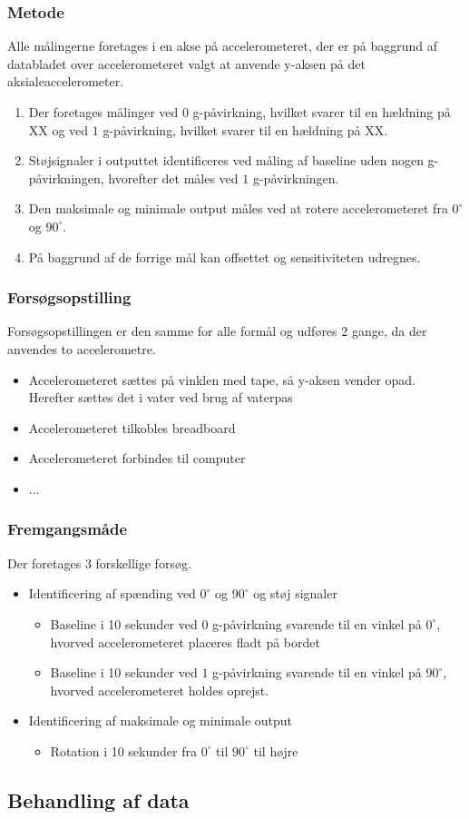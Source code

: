 \subsubsection{Metode}
Alle målingerne foretages i en akse på accelerometeret, der er på baggrund af databladet over accelerometeret valgt at anvende y-aksen på det aksialeaccelerometer. 
\begin{enumerate}
\item Der foretages målinger ved $0$ g-påvirkning, hvilket svarer til en hældning på XX og ved $1$ g-påvirkning, hvilket svarer til en hældning på XX. 
\item Støjsignaler i outputtet identificeres ved måling af baseline uden nogen g-påvirkningen, hvorefter det måles ved $1$ g-påvirkningen. 
\item Den maksimale og minimale output måles ved at rotere accelerometeret fra $0^{\circ}$ og $90^{\circ}$.
\item På baggrund af de forrige mål kan offsettet og sensitiviteten udregnes.
\end{enumerate}

\subsubsection{Forsøgsopstilling}
Forsøgsopstillingen er den samme for alle formål og udføres 2 gange, da der anvendes to accelerometre.
\begin{itemize}
\item Accelerometeret sættes på vinklen med tape, så y-aksen vender opad. Herefter sættes det i vater ved brug af vaterpas
\item Accelerometeret tilkobles breadboard
\item Accelerometeret forbindes til computer
\item ...
\end{itemize}

\subsubsection{Fremgangsmåde}
Der foretages  3 forskellige forsøg.
\begin{itemize}
\item Identificering af spænding ved $0^{\circ}$ og $90^{\circ}$ og støj signaler
\begin{itemize}
\item Baseline i 10 sekunder ved $0$ g-påvirkning svarende til en vinkel på $0^{\circ}$, hvorved accelerometeret placeres fladt på bordet
\item Baseline i 10 sekunder ved $1$ g-påvirkning svarende til en vinkel på $90^{\circ}$, hvorved accelerometeret holdes oprejst.
\end{itemize}
\item Identificering af maksimale og minimale output 
\begin{itemize}
\item Rotation i 10 sekunder fra $0^{\circ}$ til $90^{\circ}$ til højre
\end{itemize}
\end{itemize}


\subsection{Behandling af data}
